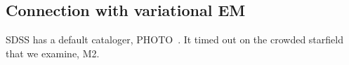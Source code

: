 \subsection{Connection with variational EM}




SDSS has a default cataloger, PHOTO~\cite{lupton2001sdss}. It timed out on the crowded starfield that we examine, M2. 

